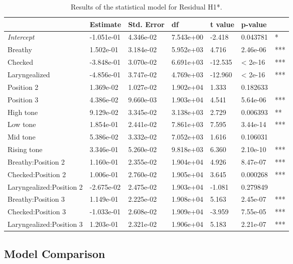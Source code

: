 \documentclass[12pt, letterpaper]{article}
\providecommand{\lsptoprule}{\midrule\toprule}
\providecommand{\lspbottomrule}{\bottomrule\midrule}
\begin{document}
\begin{table}[!h]
  \centering
  \caption{Results of the statistical model for Residual H1*.}
  \label{tab:H1H2Results}
  \begin{tabular}{lllllll}
    \lsptoprule
     & Estimate & Std. Error & df & t value & p-value & \\ \hline
    \textit{Intercept} & -1.051e-01 & 4.346e-02 & 7.543e+00 & -2.418 & 0.043781 & * \\
    Breathy & 1.502e-01 & 3.184e-02 & 5.952e+03 & 4.716 & 2.46e-06 & *** \\
    Checked & -3.848e-01 & 3.070e-02 & 6.691e+03 & -12.535 & < 2e-16 & *** \\
    Laryngealized & -4.856e-01 & 3.747e-02 & 4.769e+03 & -12.960 & < 2e-16 & *** \\
    Position 2 & 1.369e-02 & 1.027e-02 & 1.902e+04 & 1.333 & 0.182633 & \\
    Position 3 & 4.386e-02 & 9.660e-03 & 1.903e+04 & 4.541 & 5.64e-06 & *** \\
    High tone & 9.129e-02 & 3.345e-02 & 3.138e+03 & 2.729 & 0.006393 & ** \\
    Low tone & 1.854e-01 & 2.441e-02 & 7.861e+03 & 7.595 & 3.44e-14 & *** \\
    Mid tone & 5.386e-02 & 3.332e-02 & 7.052e+03 & 1.616 & 0.106031 & \\
    Rising tone & 3.346e-01 & 5.260e-02 & 9.818e+03 & 6.360 & 2.10e-10 & *** \\
    Breathy:Position 2 & 1.160e-01 & 2.355e-02 & 1.904e+04 & 4.926 & 8.47e-07 & *** \\
    Checked:Position 2 & 1.006e-01 & 2.760e-02 & 1.905e+04 & 3.645 & 0.000268 & *** \\
    Laryngealized:Position 2 & -2.675e-02 & 2.475e-02 & 1.903e+04 & -1.081 & 0.279849 & \\
    Breathy:Position 3 & 1.149e-01 & 2.225e-02 & 1.908e+04 & 5.163 & 2.45e-07 & *** \\
    Checked:Position 3 & -1.033e-01 & 2.608e-02 & 1.909e+04 & -3.959 & 7.55e-05 & *** \\
    Laryngealized:Position 3 & 1.203e-01 & 2.321e-02 & 1.906e+04 & 5.183 & 2.21e-07 & ***\\
    \lspbottomrule
  \end{tabular}
\end{table}

\subsection{Model Comparison} \label{sec:Comparison}
\end{document}
